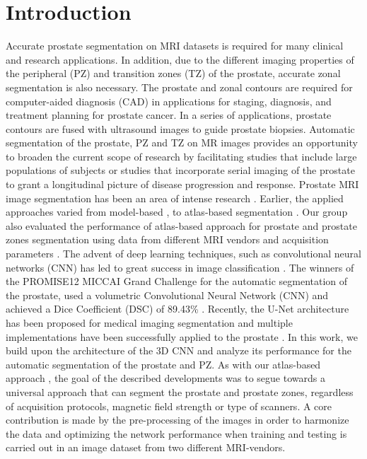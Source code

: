 \section{Introduction}
\label{sec:intro}
Accurate prostate segmentation on MRI datasets is required for many clinical and research applications. In addition, due to the different imaging properties of the peripheral (PZ) and transition zones (TZ) of the prostate, accurate zonal segmentation is also necessary. The prostate and zonal contours are required for computer-aided diagnosis (CAD) in applications for staging, diagnosis, and treatment planning for prostate cancer. In a series of applications, prostate contours are fused with ultrasound images to guide prostate biopsies. Automatic segmentation of the prostate, PZ and TZ on MR images provides an opportunity to broaden the current scope of research by facilitating studies that include large populations of subjects or studies that incorporate serial imaging of the prostate to grant a longitudinal picture of disease progression and response.  Prostate MRI image segmentation has been an area of intense research \cite{litjens2014evaluation}. Earlier, the applied approaches varied from model-based \cite{chowdhury2012concurrent,toth2012multifeature}, to atlas-based segmentation \cite{4_klein2008automatic,5_cheng2014atlas,6_xie2014low,7_tian2015fully,8_korsager2015use,9_chilali2016gland}.  Our group also evaluated the performance of atlas-based approach for prostate and prostate zones segmentation using data from different MRI vendors and acquisition parameters \cite{10_padgett2018towards}. The advent of deep learning techniques, such as convolutional neural networks (CNN) has led to great success in image classification \cite{11_krizhevsky2012imagenet,12_simonyan2011immediate}.  The winners of the PROMISE12 MICCAI Grand Challenge  for the automatic segmentation of the prostate,\cite{litjens2014evaluation}  used a volumetric Convolutional Neural Network (CNN) and achieved a Dice Coefficient (DSC) of 89.43\% \cite{yu2017volumetric}.  Recently, the U-Net architecture has been proposed \cite{13_ronneberger2015u} for medical imaging segmentation and multiple implementations have been successfully applied to the prostate  \cite{anneke}. 
In this work, we build upon the architecture of the 3D
CNN and analyze its performance for the automatic segmentation of the  prostate and PZ. As with our atlas-based approach \cite{10_padgett2018towards}, the goal of the described developments was to segue towards a universal approach that can segment the prostate and prostate zones, regardless of acquisition protocols, magnetic field strength or type of scanners. A core contribution is made by the pre-processing of the images in order to harmonize the data and optimizing the network performance when training and testing is carried out in an image dataset from two different MRI-vendors. 
